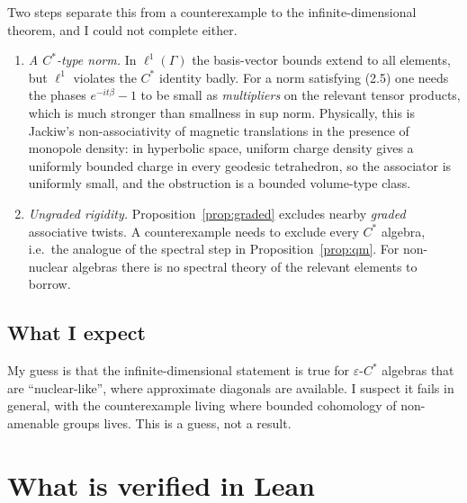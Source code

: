\documentclass[11pt]{article}
\theoremstyle{remark}
\newcommand{\eps}{\varepsilon}
\begin{document}
Two steps separate this from a counterexample to the infinite-dimensional theorem, and I could not complete either.
\begin{enumerate}
\item \emph{A $C^*$-type norm.} In $\ell^1(\Gamma)$ the basis-vector bounds extend to all elements, but $\ell^1$ violates the $C^*$ identity badly. For a norm satisfying (2.5) one needs the phases $e^{-it\beta}-1$ to be small as \emph{multipliers} on the relevant tensor products, which is much stronger than smallness in sup norm. Physically, this is Jackiw's non-associativity of magnetic translations in the presence of monopole density: in hyperbolic space, uniform charge density gives a uniformly bounded charge in every geodesic tetrahedron, so the associator is uniformly small, and the obstruction is a bounded volume-type class.
\item \emph{Ungraded rigidity.} Proposition~\ref{prop:graded} excludes nearby \emph{graded} associative twists. A counterexample needs to exclude every $C^*$ algebra, i.e.\ the analogue of the spectral step in Proposition~\ref{prop:qm}. For non-nuclear algebras there is no spectral theory of the relevant elements to borrow.
\end{enumerate}

\subsection{What I expect}

My guess is that the infinite-dimensional statement is true for $\eps$-$C^*$ algebras that are ``nuclear-like'', where approximate diagonals are available. I suspect it fails in general, with the counterexample living where bounded cohomology of non-amenable groups lives. This is a guess, not a result.

\section{What is verified in Lean}\label{sec:lean}
\end{document}

